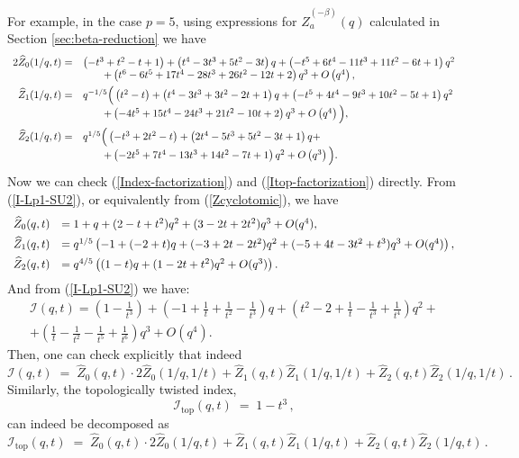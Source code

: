 \documentclass[hyper,letterpaper]{JHEP3}
\renewcommand{\hat}{\widehat}
\def\CI{{\mathcal I}}
\begin{document}
For example, in the case $p=5$, using expressions for $\hat{Z}_a^{(-\beta)}(q)$ calculated in Section \ref{sec:beta-reduction} we have
\begin{equation}
	\begin{array}{rl}
		2\hat{Z}_0(1/q,t)=&\left(-t^3+t^2-t+1\right)+\left(t^4-3 t^3+5 t^2-3 t\right)
   q+\left(-t^5+6 t^4-11 t^3+11 t^2-6 t+1\right) q^2\\ &\qquad+\left(t^6-6
   t^5+17 t^4-28 t^3+26 t^2-12 t+2\right)
   q^3+O\left(q^4\right),\vspace{1ex}
   \\
		\hat{Z}_1(1/q,t)=&q^{-1/5}\Big(\left(t^2-t\right)+\left(t^4-3 t^3+3
   t^2-2 t+1\right) q+\left(-t^5+4 t^4-9 t^3+10 t^2-5 t+1\right)
   q^2 \\& \qquad+\left(-4 t^5+15 t^4-24 t^3+21 t^2-10 t+2\right)
   q^3+O\left(q^{4}\right)\Big),\vspace{1ex}
   \\
		\hat{Z}_2(1/q,t)=&q^{1/5}\Big(\left(-t^3+2 t^2-t\right)+\left(2
   t^4-5 t^3+5 t^2-3 t+1\right) q+ \\& \qquad+\left(-2 t^5+7 t^4-13 t^3+14
   t^2-7 t+1\right) q^2+O\left(q^3\right)\Big).
	\end{array}
\end{equation}
Now we can check (\ref{Index-factorization}) and (\ref{Itop-factorization}) directly. From (\ref{I-Lp1-SU2}), or equivalently from (\ref{Zcyclotomic}), we have
\begin{equation}
	\begin{array}{rl}
		\hat{Z}_0(q,t)&=1+q+(2-t+t^2)q^2+(3-2t+2t^2)q^3+O(q^4),\vspace{1ex}\\
		\hat{Z}_1(q,t)&=q^{1/5}\left(-1+(-2+t)q+(-3+2t-2t^2)q^2+(-5+4t-3t^2+t^3)q^3+O(q^4)\right),\vspace{1ex}\\
		\hat{Z}_2(q,t)&=q^{4/5}\left((1-t)q+(1-2t+t^2)q^2+O(q^3)\right).
	\end{array}	
\end{equation}
And from (\ref{I-Lp1-SU2}) we have:
\begin{multline}
	\CI(q,t)=\left(1-\frac{1}{t^3}\right)+\left(-1+\frac{1}{t}+\frac{1}{t^2}-\frac{1}{t^3}\right)
   q+\left(t^2-2+\frac{1}{t}-\frac{1}{t^3}+\frac{1}{t^4}\right)
   q^2+\\+\left(\frac{1}{t}-\frac{1}{t^2}-\frac{1}{t^5}+\frac{1}{t^6}
   \right) q^3+O\left(q^4\right).
\end{multline}
Then, one can check explicitly that indeed
\begin{equation}
	\CI(q,t) \; = \; \hat{Z}_0(q,t)\cdot 2\hat{Z}_0(1/q,1/t)+
	\hat{Z}_1(q,t)\hat{Z}_1(1/q,1/t)+
	\hat{Z}_2(q,t)\hat{Z}_2(1/q,1/t) \,.
\end{equation}
Similarly, the topologically twisted index,
\begin{equation}
	\CI_\text{top}(q,t) \; = \; 1-t^3 \,,
\end{equation}
can indeed be decomposed as
\begin{equation}
	\CI_\text{top}(q,t) \; = \; \hat{Z}_0(q,t)\cdot 2\hat{Z}_0(1/q,t)+
	\hat{Z}_1(q,t)\hat{Z}_1(1/q,t)+
	\hat{Z}_2(q,t)\hat{Z}_2(1/q,t) \,.
\end{equation}
\end{document}
